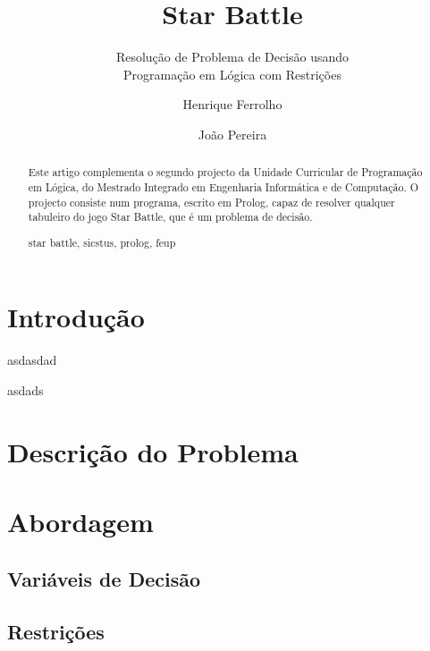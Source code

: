 \documentclass[runningheads,a4paper]{llncs}
\newcommand{\keywords}[1]{\par\addvspace\baselineskip
\noindent\keywordname\enspace\ignorespaces#1}
\begin{document}
\mainmatter  %

\title{Star Battle}
\subtitle{Resolução de Problema de Decisão usando\\
Programação em Lógica com Restrições}

\author{Henrique Ferrolho\and João Pereira}


\maketitle


\begin{abstract}
Este artigo complementa o segundo projecto da Unidade Curricular de Programação em Lógica, do Mestrado Integrado em Engenharia Informática e de Computação. O projecto consiste num programa, escrito em Prolog, capaz de resolver qualquer tabuleiro do jogo Star Battle, que é um problema de decisão.
\keywords{star battle, sicstus, prolog, feup}
\end{abstract}


\section{Introdução}

asdasdad

asdads

\section{Descrição do Problema}


\section{Abordagem}

\subsection{Variáveis de Decisão}

\subsection{Restrições}
\end{document}
